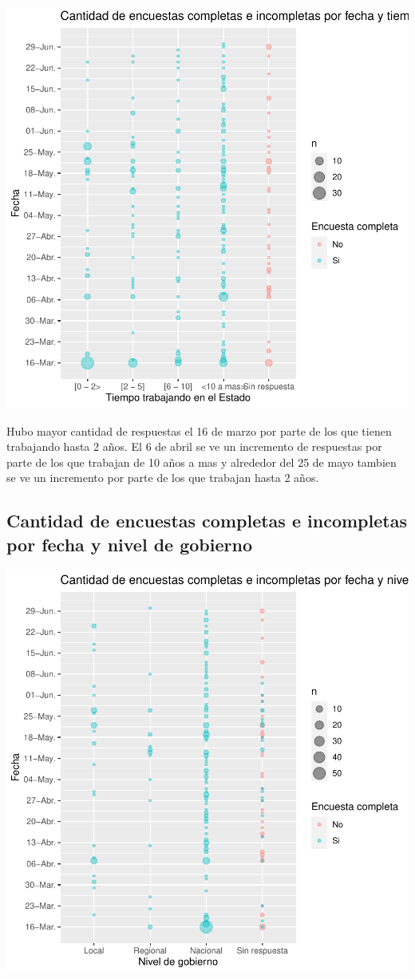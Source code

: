 \documentclass{article}
\begin{document}
\includegraphics{seguimientov3-068}

Hubo mayor cantidad de respuestas el 16 de marzo por parte de los que tienen trabajando hasta 2 años. El 6 de abril se ve un incremento de respuestas por parte de los que trabajan de 10 años a mas y alrededor del 25 de mayo tambien se ve un incremento por parte de los que trabajan hasta 2 años.

\subsection{Cantidad de encuestas completas e incompletas por fecha y nivel de gobierno}

\includegraphics{seguimientov3-069}
\end{document}

